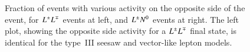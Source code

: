 \begin{figure}
	\caption{Fraction of events with various activity on the opposite side of the event, for $L^{\pm}L^{\mp}$ events at left, and $L^{\pm}N^{0}$ events at right. The left plot, showing the opposite side activity for a $L^{\pm}L^{\mp}$ final state, is identical for the type~III seesaw and vector-like lepton models.
	}
	\label{fig:opposite-side-br}
\end{figure}


